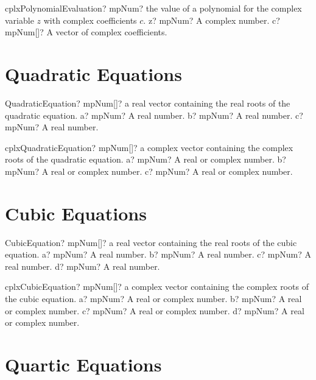 \documentclass[12pt,a4paper,openany]{book}
\begin{document}
\begin{mpFunctionsExtract}
\mpFunctionTwo
{cplxPolynomialEvaluation? mpNum? the value of a polynomial for the complex variable $z$ with complex coefficients $c$.}
{z? mpNum? A complex number.}
{c? mpNum[]? A vector of complex coefficients.}
\end{mpFunctionsExtract}

\section{Quadratic Equations}

\begin{mpFunctionsExtract}
\mpFunctionThree
{QuadraticEquation? mpNum[]? a real vector containing the real roots of the quadratic equation.}
{a? mpNum? A real number.}
{b? mpNum? A real number.}
{c? mpNum? A real number.}
\end{mpFunctionsExtract}

\begin{mpFunctionsExtract}
\mpFunctionThree
{cplxQuadraticEquation? mpNum[]? a complex vector containing the complex roots of the quadratic equation.}
{a? mpNum? A real or complex number.}
{b? mpNum? A real or complex number.}
{c? mpNum? A real or complex number.}
\end{mpFunctionsExtract}

\section{Cubic Equations}

\begin{mpFunctionsExtract}
\mpFunctionFour
{CubicEquation? mpNum[]? a real vector containing the real roots of the cubic equation.}
{a? mpNum? A real number.}
{b? mpNum? A real number.}
{c? mpNum? A real number.}
{d? mpNum? A real number.}
\end{mpFunctionsExtract}

\begin{mpFunctionsExtract}
\mpFunctionFour
{cplxCubicEquation? mpNum[]? a complex vector containing the complex roots of the cubic equation.}
{a? mpNum? A real or complex number.}
{b? mpNum? A real or complex number.}
{c? mpNum? A real or complex number.}
{d? mpNum? A real or complex number.}
\end{mpFunctionsExtract}

\section{Quartic Equations}
\end{document}
